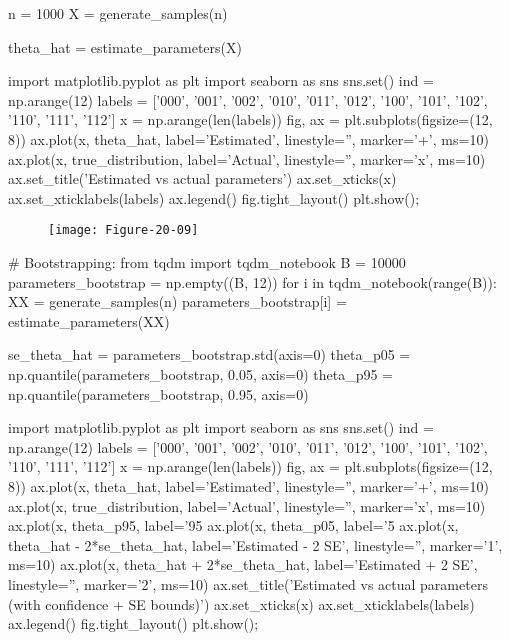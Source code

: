 \begin{python}
n = 1000
X = generate_samples(n)
\end{python}

\begin{python}
theta_hat = estimate_parameters(X)
\end{python}

\begin{python}
import matplotlib.pyplot as plt
import seaborn as sns
sns.set()
ind = np.arange(12)
labels = ['000', '001', '002', '010', '011', '012', '100', '101', '102', '110', '111', '112']
x = np.arange(len(labels))
fig, ax = plt.subplots(figsize=(12, 8))
ax.plot(x, theta_hat, label='Estimated', 
        linestyle='', marker='+', ms=10)
ax.plot(x, true_distribution, label='Actual', 
        linestyle='', marker='x', ms=10)
ax.set_title('Estimated vs actual parameters')
ax.set_xticks(x)
ax.set_xticklabels(labels)
ax.legend()
fig.tight_layout()
plt.show();
\end{python}



\begin{figure}[H]
\centering
\texttt{[image: Figure-20-09]}
\end{figure}


\begin{python}
# Bootstrapping:
from tqdm import tqdm_notebook
B = 10000
parameters_bootstrap = np.empty((B, 12))
for i in tqdm_notebook(range(B)):
    XX = generate_samples(n)
    parameters_bootstrap[i] = estimate_parameters(XX)
    
se_theta_hat = parameters_bootstrap.std(axis=0)
theta_p05 = np.quantile(parameters_bootstrap, 0.05, axis=0)
theta_p95 = np.quantile(parameters_bootstrap, 0.95, axis=0)
\end{python}

\begin{python}
import matplotlib.pyplot as plt
import seaborn as sns
sns.set()
ind = np.arange(12)
labels = ['000', '001', '002', '010', '011', '012', '100', '101', '102', '110', '111', '112']
x = np.arange(len(labels))
fig, ax = plt.subplots(figsize=(12, 8))
ax.plot(x, theta_hat, label='Estimated', linestyle='', marker='+', ms=10)
ax.plot(x, true_distribution, label='Actual', linestyle='', marker='x', ms=10)
ax.plot(x, theta_p95, label='95%
ax.plot(x, theta_p05, label='5%
ax.plot(x, theta_hat - 2*se_theta_hat, label='Estimated - 2 SE', linestyle='', marker='1', ms=10)
ax.plot(x, theta_hat + 2*se_theta_hat, label='Estimated + 2 SE', linestyle='', marker='2', ms=10)
ax.set_title('Estimated vs actual parameters (with confidence + SE bounds)')
ax.set_xticks(x)
ax.set_xticklabels(labels)
ax.legend()
fig.tight_layout()
plt.show();
\end{python}

